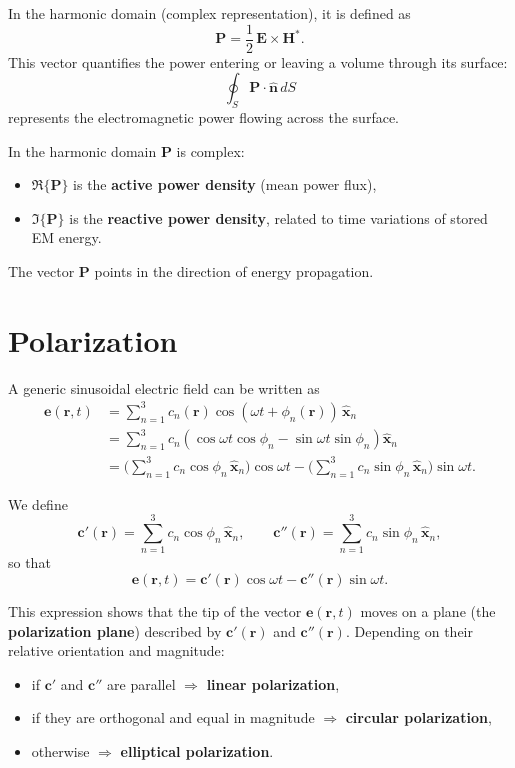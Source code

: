In the harmonic domain (complex representation), it is defined as
\begin{equation}
    \mathbf{P} = \frac{1}{2}\,\mathbf{E}\times\mathbf{H}^*.
\end{equation}
This vector quantifies the power entering or leaving a volume through its surface:
\[
\oint_S \mathbf{P}\cdot\hat{\mathbf{n}}\,dS
\]
represents the electromagnetic power flowing across the surface.

\smallskip
In the harmonic domain $\mathbf{P}$ is complex:
\begin{itemize}
    \item $\Re\{\mathbf{P}\}$ is the \textbf{active power density} (mean power flux),
    \item $\Im\{\mathbf{P}\}$ is the \textbf{reactive power density}, related to time variations of stored EM energy.
\end{itemize}
The vector $\mathbf{P}$ points in the direction of energy propagation.

\section{Polarization}
A generic sinusoidal electric field can be written as
\begin{align}
    \mathbf{e}(\mathbf{r},t)
    &= \sum_{n=1}^{3} c_n(\mathbf{r})\cos(\omega t + \phi_n(\mathbf{r}))\,\hat{\mathbf{x}}_n\\
    &= \sum_{n=1}^{3} c_n\left(\cos\omega t \cos\phi_n - \sin\omega t \sin\phi_n\right)\hat{\mathbf{x}}_n\\
    &= \Bigg(\sum_{n=1}^{3} c_n\cos\phi_n\,\hat{\mathbf{x}}_n\Bigg)\cos\omega t
       -\Bigg(\sum_{n=1}^{3} c_n\sin\phi_n\,\hat{\mathbf{x}}_n\Bigg)\sin\omega t.
\end{align}

We define
\[
\mathbf{c}'(\mathbf{r}) = \sum_{n=1}^{3} c_n\cos\phi_n\,\hat{\mathbf{x}}_n, 
\qquad
\mathbf{c}''(\mathbf{r}) = \sum_{n=1}^{3} c_n\sin\phi_n\,\hat{\mathbf{x}}_n,
\]
so that
\begin{equation}
    \mathbf{e}(\mathbf{r},t)
    = \mathbf{c}'(\mathbf{r})\cos\omega t - \mathbf{c}''(\mathbf{r})\sin\omega t.
\end{equation}

This expression shows that the tip of the vector $\mathbf{e}(\mathbf{r},t)$
moves on a plane (the \textbf{polarization plane}) described by
$\mathbf{c}'(\mathbf{r})$ and $\mathbf{c}''(\mathbf{r})$.
Depending on their relative orientation and magnitude:
\begin{itemize}
    \item if $\mathbf{c}'$ and $\mathbf{c}''$ are parallel $\Rightarrow$ \textbf{linear polarization},
    \item if they are orthogonal and equal in magnitude $\Rightarrow$ \textbf{circular polarization},
    \item otherwise $\Rightarrow$ \textbf{elliptical polarization}.
\end{itemize}

